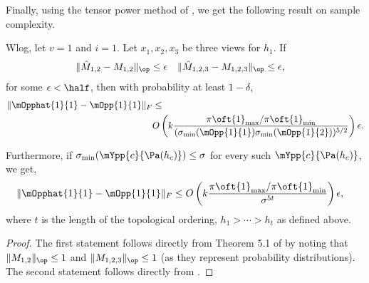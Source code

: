 Finally, using the tensor power method of \citep{anandkumar13tensor}, we
  get the following result on sample complexity.
\begin{theorem}
  \label{thm:sample-complexity-1}
  Wlog, let $v=1$ and $i=1$. Let $x_1, x_2, x_3$ be three views for
  $h_1$.  
  If 
\begin{align*}
  \|\hat M_{1,2} - M_{1,2}\|_{\op} &\le \epsilon & \|\hat M_{1,2,3} - M_{1,2,3}\|_{\op} &\le \epsilon,
\end{align*}
for some $\epsilon < \half$, then
with probability at least $1 - \delta$,
\begin{align*}
  \|\mOpphat{1}{1} - \mOpp{1}{1}\|_F 
    &\le  \\
    &
      O\left( k 
      \frac{{\pi\oft{1}}_{\max}/{\pi\oft{1}}_{\min}} 
      {(\sigma_{\min}(\mOpp{1}{1}) \sigma_{\min}(\mOpp{1}{2}))^{5/2}} \right) \epsilon.
\end{align*}

Furthermore, if $\sigma_{\min}(\mYpp{c}{\Pa(h_c)}) \le \sigma$ for every
  such
$\mYpp{c}{\Pa(h_c)}$, we get,
\begin{align*}
  \|\mOpphat{1}{1} - \mOpp{1}{1}\|_F 
    &\le 
      O\left( k 
      \frac{{\pi\oft{1}}_{\max}/{\pi\oft{1}}_{\min}} 
      {\sigma^{5t}} \right) \epsilon,
\end{align*}
where $t$ is the length of the topological ordering, $h_1 > \cdots
> h_t$ as defined above.
\end{theorem}
\begin{proof}
  The first statement follows directly from Theorem 5.1 of
  \citet{anandkumar13tensor} by noting that $\|M_{1,2}\|_\op \le 1$ and
  $\|M_{1,2,3}\|_\op \le 1$ (as they represent probability
  distributions). The second statement follows directly from
  .
\end{proof}

